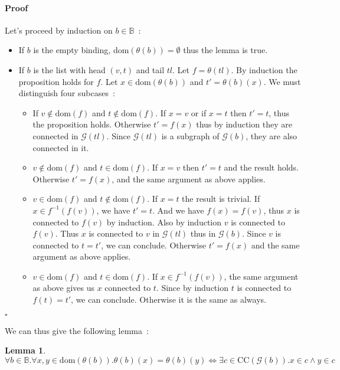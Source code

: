\documentclass[]{article}
\newcommand{\G}{\mathscr{G}}
\newcommand{\1}{\mathbbm{1}}
\newcommand{\0}{\mathbbm{0}}
\newtheorem{lem}{Lemma}
\newenvironment{prf}{\paragraph{Proof}}{\hfill$\square$}
\newcommand{\dom}{\text{dom}}
\begin{document}
\begin{prf}
    Let's proceed by induction on $b\in\mathbb{B}$~:\begin{itemize}
        \item If $b$ is the empty binding, $\dom(\theta(b)) = \emptyset$ thus the
            lemma is true.
        \item If $b$ is the list with head $(v,t)$ and tail $tl$. Let $f = \theta(tl)$.
            By induction the proposition holds for $f$. Let $x\in\dom(\theta(b))$ and 
            $t' = \theta(b)(x)$.
            We must distinguish four subcases~:\begin{itemize}
                \item If $v\not\in\dom(f)$ and $t\not\in\dom(f)$. If $x = v$ or if
                    $x = t$ then $t' = t$, thus the proposition holds. Otherwise
                    $t' = f(x)$ thus by induction they are connected in $\G(tl)$.
                    Since $\G(tl)$ is a subgraph of $\G(b)$, they are also connected
                    in it.
                \item $v\not\in\dom(f)$ and $t\in\dom(f)$. If $x = v$ then $t' = t$ and
                    the result holds. Otherwise $t' = f(x)$, and the same argument as
                    above applies.
                \item $v\in\dom(f)$ and $t\not\in\dom(f)$. If $x = t$ the result
                    is trivial. If $x\in f^{-1}(f(v))$, we have $t' = t$. And we have
                    $f(x) = f(v)$, thus $x$ is connected to $f(v)$ by induction. Also
                    by induction $v$ is connected to $f(v)$. Thus $x$ is connected to
                    $v$ in $\G(tl)$ thus in $\G(b)$. Since $v$ is connected to $t=t'$,
                    we can conclude. Otherwise $t' = f(x)$ and the same argument as above
                    applies.
                \item $v\in\dom(f)$ and $t\in\dom(f)$. If $x\in f^{-1}(f(v))$, the same
                    argument as above gives us $x$ connected to $t$. Since by induction
                    $t$ is connected to $f(t) = t'$, we can conclude. Otherwise it is the
                    same as always.
            \end{itemize}
    \end{itemize}
\end{prf}

We can thus give the following lemma~:

\begin{lem}\label{subst_connection}
    \[\forall b\in\mathbb{B}. \forall x, y\in\dom(\theta(b)).
    \theta(b)(x) = \theta(b)(y) \iff
    \exists c\in\text{CC}(\G(b)). x\in c\wedge y\in c\]
\end{lem}
\end{document}
